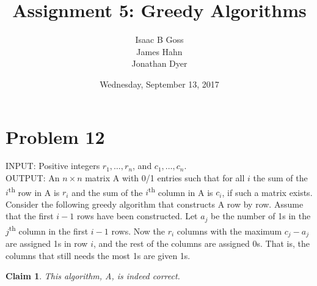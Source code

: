 \documentclass{article}
\author{Isaac B Goss\\ James Hahn\\ Jonathan Dyer}
\title{Assignment 5: Greedy Algorithms}
\date{Wednesday, September 13, 2017}
\newtheorem{thm}{Claim}
\providecommand{\prob}[1]{\section*{Problem #1}}
\begin{document}
\maketitle

    \prob{12}
	INPUT: Positive integers $r_1, \dots, r_n $, and $c_1, \dots, c_n$. \\
	OUTPUT: An $n \times n$ matrix A with 0/1 entries such that for all $i$ the sum of the $i$\textsuperscript{th} row in A is $r_i$ and the sum of
	the $i$\textsuperscript{th} column in A is $c_i$, if such a matrix exists. Consider the following greedy algorithm that constructs A row
	by row. Assume that the first $i - 1$ rows have been constructed. Let $a_j$ be the number of 1\textsc{}s in the $j$\textsuperscript{th} column in
	the first $i - 1$ rows. Now the $r_i$ columns with the maximum $c_j - a_j$ are assigned 1\textsc{}s in row $i$, and the rest of the columns
	are assigned 0\textsc{}s. That is, the columns that still needs the most 1\textsc{}s are given 1\textsc{}s.

    \begin{thm}
        This algorithm, A, is indeed correct.
    \end{thm}
\end{document}
